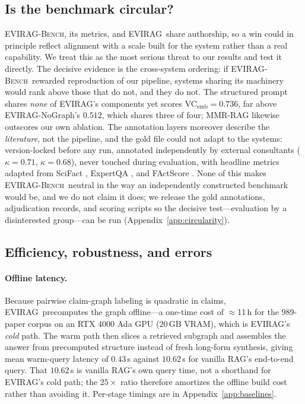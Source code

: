 \documentclass[11pt]{article}
\newcommand{\system}{\textsc{EVIRAG}\xspace}
\newcommand{\bench}{\textsc{EVIRAG-Bench}\xspace}
\begin{document}
\subsection{Is the benchmark circular?}
\label{sec:circularity}

\bench, its metrics, and \system\ share authorship, so a win could in principle
reflect alignment with a scale built for the system rather than a real
capability.  We treat this as the most serious threat to our results and test
it directly.  The decisive evidence is the cross-system ordering: if
\bench\ rewarded reproduction of our pipeline, systems sharing its machinery
would rank above those that do not, and they do not.  The structured prompt
shares \emph{none} of \system's components yet scores
VC$_\text{emb}{=}0.736$, far above \system-NoGraph's $0.512$, which shares
three of four; MMR-RAG likewise outscores our own
ablation.  The annotation layers moreover describe the \emph{literature}, not
the pipeline, and the gold file could not adapt to the systems: version-locked
before any run, annotated independently by external consultants
($\kappa{=}0.71$, $\kappa{=}0.68$), never touched during evaluation, with
headline metrics adapted from SciFact \citep{wadden2020scifact}, ExpertQA
\citep{malaviya2024expertqa}, and FActScore \citep{min2023factscore}.  None of
this makes \bench\ neutral in the way an independently constructed benchmark
would be, and we do not claim it does; we release the gold annotations,
adjudication records, and scoring scripts so the decisive test---evaluation by
a disinterested group---can be run (Appendix~\ref{app:circularity}).

\subsection{Efficiency, robustness, and errors}
\label{sec:efficiency}

\paragraph{Offline latency.}
Because pairwise claim-graph labeling is quadratic in claims, \system\
precomputes the graph offline---a one-time cost of $\approx$11\,h for the
989-paper corpus on an RTX 4000 Ada GPU (20\,GB VRAM), which is \system's \emph{cold} path.
The warm path then slices a retrieved subgraph and assembles the answer from
precomputed structure instead of fresh long-form synthesis, giving mean
warm-query latency of $0.43$\,s against $10.62$\,s for vanilla RAG's
end-to-end query.  That $10.62$\,s is vanilla RAG's own query time, not a
shorthand for \system's cold path; the $25{\times}$ ratio therefore amortizes
the offline build cost rather than avoiding it.  Per-stage timings are in
Appendix~\ref{app:baselines}.
\end{document}
